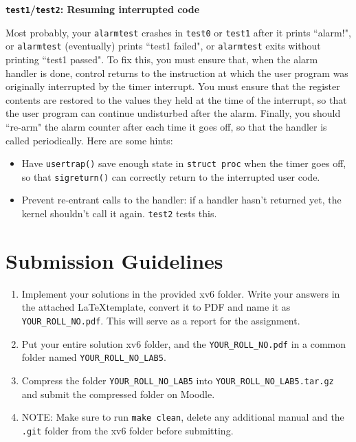 \documentclass[11pt]{exam}
\begin{document}
\begin{questions}
{\flushleft \bf \texttt{test1}/\texttt{test2}: Resuming interrupted code}

Most probably, your {\tt alarmtest} crashes in {\tt test0} or {\tt test1} after it prints ``alarm!", or {\tt alarmtest} (eventually) prints ``test1 failed", or {\tt alarmtest} exits without printing ``test1 passed". To fix this, you must ensure that, when the alarm handler is done, control returns to the instruction at which the user program was originally interrupted by the timer interrupt. You must ensure that the register contents are restored to the values they held at the time of the interrupt, so that the user program can continue undisturbed after the alarm. Finally, you should ``re-arm" the alarm counter after each time it goes off, so that the handler is called periodically. Here are some hints:

\begin{itemize}
    \item Have \texttt{usertrap()} save enough state in {\tt struct proc} when the timer goes off, so that \texttt{sigreturn()} can correctly return to the interrupted user code.
    \item Prevent re-entrant calls to the handler: if a handler hasn't returned yet, the kernel shouldn't call it again. {\tt test2} tests this. 
\end{itemize}
    
\end{questions}


\section*{Submission Guidelines}  
\begin{enumerate}
    \item Implement your solutions in the provided xv6 folder. Write your answers in the attached \LaTeX template, convert it to PDF and name it as \texttt{YOUR\_ROLL\_NO.pdf}. This will serve as a report for the assignment.
    \item Put your entire solution xv6 folder, and the \texttt{YOUR\_ROLL\_NO.pdf} in a common folder named \texttt{YOUR\_ROLL\_NO\_LAB5}. 
    \item Compress the folder \texttt{YOUR\_ROLL\_NO\_LAB5} into \texttt{YOUR\_ROLL\_NO\_LAB5.tar.gz} and submit the compressed folder on Moodle.
    \item NOTE: Make sure to run \texttt{make clean}, delete any additional manual and the \texttt{.git} folder from the xv6 folder before submitting.
\end{enumerate}
\end{document}
